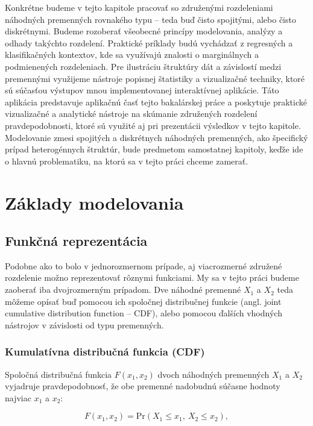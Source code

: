 Konkrétne budeme v tejto kapitole pracovať so združenými rozdeleniami náhodných premenných rovnakého typu – teda buď čisto spojitými, alebo čisto diskrétnymi. Budeme rozoberať všeobecné princípy modelovania, analýzy a odhady takýchto rozdelení. Praktické príklady budú vychádzať z regresných a klasifikačných kontextov, kde sa využívajú znalosti o marginálnych a podmienených rozdeleniach. Pre ilustráciu štruktúry dát a závislostí medzi premennými využijeme nástroje popisnej štatistiky a vizualizačné techniky, ktoré sú súčasťou výstupov mnou implementovanej interaktívnej aplikácie. Táto aplikácia predstavuje aplikačnú časť tejto bakalárskej práce a poskytuje praktické vizualizačné a analytické nástroje na skúmanie združených rozdelení pravdepodobnosti, ktoré sú využité aj pri prezentácii výsledkov v tejto kapitole. Modelovanie zmesi spojitých a diskrétnych náhodných premenných, ako špecifický prípad heterogénnych štruktúr, bude predmetom samostatnej kapitoly, keďže ide o hlavnú problematiku, na ktorú sa v tejto práci chceme zamerať.


\section{Základy modelovania}\label{sec:joint_zaklady_modelovania}

\subsection{Funkčná reprezentácia}\label{subsec:joint_representation}

Podobne ako to bolo v jednorozmernom prípade, aj viacrozmerné združené rozdelenie možno reprezentovať rôznymi funkciami. My sa v tejto práci budeme zaoberať iba dvojrozmerným prípadom. Dve náhodné premenné $X_1$ a $X_2$ teda môžeme opísať buď pomocou ich spoločnej distribučnej funkcie (angl. joint cumulative distribution function – CDF), alebo pomocou ďalších vhodných nástrojov v závislosti od typu premenných.

\subsubsection{Kumulatívna distribučná funkcia (CDF)}\label{subsec:joint_cdf}

Spoločná distribučná funkcia $F(x_1, x_2)$ dvoch náhodných premenných $X_1$ a $X_2$ vyjadruje pravdepodobnosť, že obe premenné nadobudnú súčasne hodnoty najviac $x_1$ a $x_2$:

\begin{equation}
F(x_1, x_2) = \mathrm{Pr}(X_1 \leq x_1,\ X_2 \leq x_2),
\end{equation}

